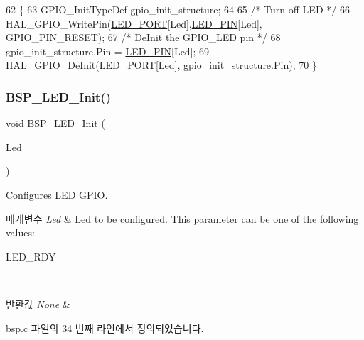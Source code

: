 \begin{DoxyCode}
62 \{
63   GPIO\_InitTypeDef  gpio\_init\_structure;
64 
65   \textcolor{comment}{/* Turn off LED */}
66   HAL\_GPIO\_WritePin(\mbox{\hyperlink{bsp_8c_a1127c0cf12e4ec7a66f2a64cd7407218}{LED\_PORT}}[Led],\mbox{\hyperlink{bsp_8c_a51722a2d3aff3970f123a94ac62b908f}{LED\_PIN}}[Led], GPIO\_PIN\_RESET);
67   \textcolor{comment}{/* DeInit the GPIO\_LED pin */}
68   gpio\_init\_structure.Pin = \mbox{\hyperlink{bsp_8c_a51722a2d3aff3970f123a94ac62b908f}{LED\_PIN}}[Led];
69   HAL\_GPIO\_DeInit(\mbox{\hyperlink{bsp_8c_a1127c0cf12e4ec7a66f2a64cd7407218}{LED\_PORT}}[Led], gpio\_init\_structure.Pin);
70 \}
\end{DoxyCode}
\mbox{\label{group___lory_s_d_k___l_e_d___functions_gab58a4f16a476a53653c5c400e3bed158}} 
\subsubsection{\texorpdfstring{B\+S\+P\+\_\+\+L\+E\+D\+\_\+\+Init()}{BSP\_LED\_Init()}}
{\footnotesize\ttfamily void B\+S\+P\+\_\+\+L\+E\+D\+\_\+\+Init (\begin{DoxyParamCaption}\item[{\mbox{\hyperlink{_lory_s_d_k__hw__conf_8h_aa059704b7ca945eb9c1e7f2c3d03fecd}{Led\+\_\+\+Type\+Def}}}]{Led }\end{DoxyParamCaption})}



Configures L\+ED G\+P\+IO. 


\begin{DoxyParams}{매개변수}
{\em Led} & Led to be configured. This parameter can be one of the following values\+: \begin{DoxyItemize}
\item L\+E\+D\+\_\+\+R\+DY \end{DoxyItemize}
\\
\hline
\end{DoxyParams}

\begin{DoxyRetVals}{반환값}
{\em None} & \\
\hline
\end{DoxyRetVals}


bsp.\+c 파일의 34 번째 라인에서 정의되었습니다.


